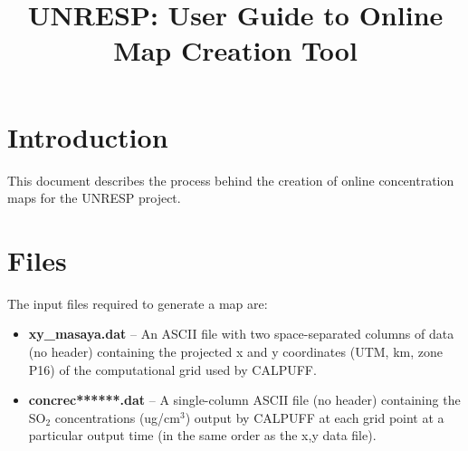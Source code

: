 \documentclass[10pt,a4paper]{article}
\title{UNRESP: User Guide to Online Map Creation Tool}
\begin{document}
\maketitle
\tableofcontents

\section{Introduction}
This document describes the process behind the creation of online concentration maps for the UNRESP project.

\section{Files}
The input files required to generate a map are:
\begin{itemize}
\item \textbf{xy\_masaya.dat} -- An ASCII file with two space-separated columns of data (no header) containing the projected x and y coordinates (UTM, km, zone P16) of the computational grid used by CALPUFF.
\item \textbf{concrec******.dat} -- A single-column ASCII file (no header) containing the SO$_2$ concentrations (ug/cm$^3$) output by CALPUFF at each grid point at a particular output time (in the same order as the x,y data file).
\end{itemize}
\end{document}
